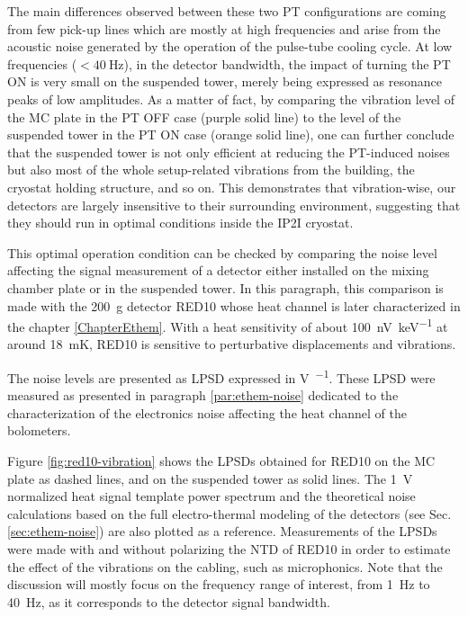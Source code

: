 The main differences observed between these two PT configurations are coming from few pick-up lines which are mostly at high frequencies and arise from the acoustic noise generated by the operation of the pulse-tube cooling cycle.
At low frequencies ($<\SI{40}{\Hz}$), in the detector bandwidth, the impact of turning the PT ON is very small on the suspended tower, merely being expressed as resonance peaks of low amplitudes.
As a matter of fact, by comparing the vibration level of the MC plate in the PT OFF case (purple solid line) to the level of the suspended tower in the PT ON case (orange solid line), one can further conclude that the suspended tower is not only efficient at reducing the PT-induced noises but also most of the whole setup-related vibrations from the building, the cryostat holding structure, and so on.
This demonstrates that vibration-wise, our detectors are largely insensitive to their surrounding environment, suggesting that they should run in optimal conditions inside the IP2I cryostat.

This optimal operation condition can be checked by comparing the noise level affecting the signal measurement of a detector either installed on the mixing chamber plate or in the suspended tower. In this paragraph, this comparison is made with the \SI{200}{\g} detector RED10 whose heat channel is later characterized in the chapter \ref{ChapterEthem}. With a heat sensitivity of about \SI{100}{\nano\volt\per\kilo\eV} at around \SI{18}{\milli\kelvin}, RED10 is sensitive to perturbative displacements and vibrations. 

The noise levels are presented as LPSD expressed in \si{\volt\per\sqrthz}. These LPSD were measured as presented in paragraph \ref{par:ethem-noise} dedicated to the characterization of the electronics noise affecting the heat channel of the bolometers.

Figure \ref{fig:red10-vibration} shows the LPSDs obtained for RED10 on the MC plate as dashed lines, and on the suspended tower as solid lines. The \SI{1}{\volt} normalized heat signal template power spectrum and the theoretical noise calculations based on the full electro-thermal modeling of the detectors (see Sec.\ref{sec:ethem-noise}) are also plotted as a reference. Measurements of the LPSDs were made with and without polarizing the NTD of RED10 in order to estimate the effect of the vibrations on the cabling, such as microphonics. Note that the discussion will mostly focus on the frequency range of interest, from \SI{1}{\Hz} to \SI{40}{\Hz}, as it corresponds to the detector signal bandwidth.

